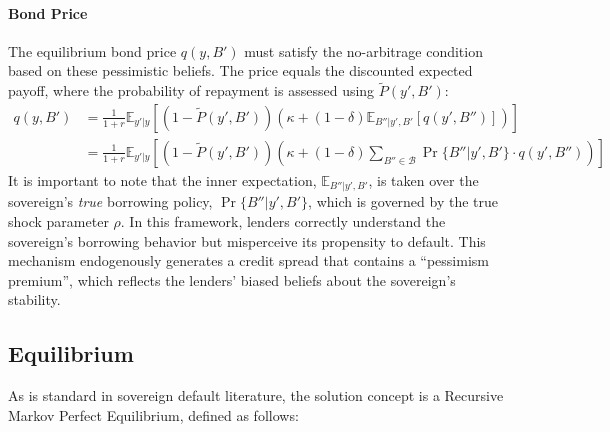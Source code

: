 \documentclass[12pt]{article}
\theoremstyle{plain}
\begin{document}
\paragraph{Bond Price}The equilibrium bond price $q(y, B')$ must satisfy the no-arbitrage condition
based on these pessimistic beliefs. The price equals the discounted expected
payoff, where the probability of repayment is assessed using $\tilde{P}(y',
	B')$:
\begin{equation}
	\begin{aligned}
		q(y, B') & = \frac{1}{1+r} \mathbb{E}_{y'|y} \left[ \left(1 - \tilde{P}(y', B') \right) \left( \kappa + (1-\delta) \mathbb{E}_{B''|y',B'} \left[ q(y', B'') \right] \right) \right]            \\
		         & = \frac{1}{1+r} \mathbb{E}_{y'|y} \left[ \left(1 - \tilde{P}(y', B') \right) \left( \kappa + (1-\delta)\sum_{B'' \in \mathcal{B}} \Pr\{B''|y', B'\}\cdot q(y', B'') \right) \right]
	\end{aligned}
	\label{eq:qprice_biased}
\end{equation}
It is important to note that the inner expectation, $\mathbb{E}_{B''|y',B'}$, is taken over the sovereign's \textit{true} borrowing policy, $\Pr\{B''|y', B'\}$, which is governed by the true shock parameter $\rho$. In this framework, lenders correctly understand the sovereign's borrowing behavior but misperceive its propensity to default. This mechanism endogenously generates a credit spread that contains a ``pessimism premium'', which reflects the lenders' biased beliefs about the sovereign's stability.


\subsection{Equilibrium}

As is standard in sovereign default literature, the solution concept is a
Recursive Markov Perfect Equilibrium, defined as follows:
\end{document}
